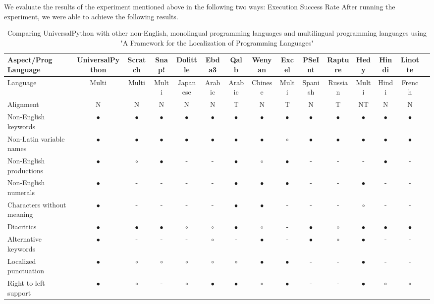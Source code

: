 \documentclass[conference]{IEEEtran}
\begin{document}
We evaluate the results of the experiment mentioned above in the following two ways:
Execution Success Rate After running the experiment, we were able to achieve the following results.


\begin{table}[t]
    \caption{Comparing UniversalPython with other non-English, monolingual programming languages and multilingual programming languages using "A Framework for the Localization of Programming Languages" \cite{swidan2023framework} }
    \centering
    \begin{tabularx}{\textwidth}{l *{14}{c}}
    \hline
    Aspect/Prog Language & UniversalPython & Scratch & Snap! & Dolittle & Ebda3 & Qalb & Wenyan & Excel & PSeInt & Rapture & Hedy & Hindi & Linotte \\
    \hline
    Language & Multi & Multi & Multi & Japanese & Arabic & Arabic & Chinese & Multi & Spanish & Russian & Multi & Hindi & French \\
    Alignment & N & N & N & N & N & T & N & T & N & T & NT & N & N \\
    Non-English keywords & $\bullet$ & $\bullet$ & $\bullet$ & $\bullet$ & $\bullet$ & $\bullet$ & $\bullet$ & $\bullet$ & $\bullet$ & $\bullet$ & $\bullet$ & $\bullet$ & $\bullet$ \\
    Non-Latin variable names & $\bullet$ & $\bullet$ & $\bullet$ & $\bullet$ & $\bullet$ & $\bullet$ & $\bullet$ & $\circ$ & $\bullet$ & $\bullet$ & $\bullet$ & $\bullet$ & $\bullet$ \\
    Non-English productions & $\bullet$ & $\circ$ & $\bullet$ & - & - & $\bullet$ & $\circ$ & $\bullet$ & - & - & - & $\bullet$ & - \\
    Non-English numerals & $\bullet$ & - & - & - & - & $\bullet$ & $\bullet$ & $\bullet$ & - & - & $\bullet$ & - & - \\
    Characters without meaning & $\bullet$ & - & - & - & - & $\bullet$ & $\bullet$ & - & - & - & $\circ$ & - & - \\
    Diacritics & $\bullet$ & $\bullet$ & $\bullet$ & $\circ$ & $\circ$ & $\bullet$ & $\circ$ & - & $\bullet$ & $\circ$ & $\bullet$ & $\bullet$ & $\bullet$ \\
    Alternative keywords & $\bullet$ & - & - & - & $\circ$ & - & $\bullet$ & - & $\bullet$ & $\circ$ & $\bullet$ & - & - \\
    Localized punctuation & $\bullet$ & $\circ$ & $\circ$ & $\circ$ & $\circ$ & $\circ$ & $\bullet$ & $\bullet$ & - & - & $\bullet$ & - & - \\
    Right to left support & $\bullet$ & $\circ$ & - & $\circ$ & $\bullet$ & $\bullet$ & $\circ$ & $\bullet$ & - & - & $\bullet$ & $\circ$ & $\circ$ \\

\end{tabularx}
\end{table}
\end{document}
